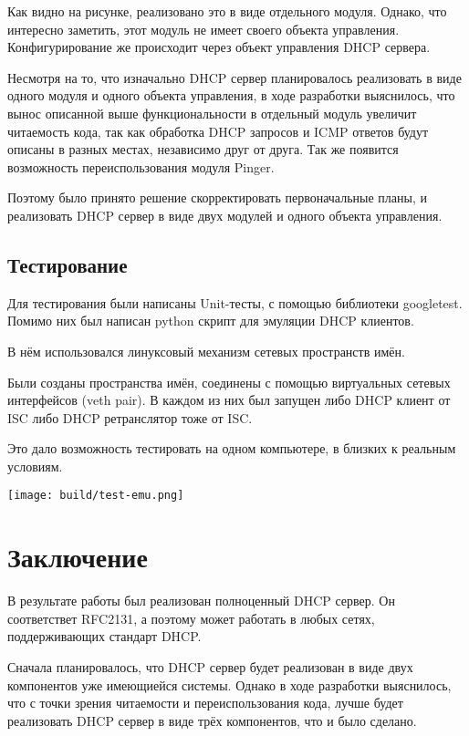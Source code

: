\documentclass[14pt]{extarticle}
\begin{document}
Как видно на рисунке, реализовано это в виде отдельного модуля. Однако, что интересно заметить, этот модуль не имеет своего объекта управления. Конфигурирование же происходит через объект управления DHCP сервера.

Несмотря на то, что изначально DHCP сервер планировалось реализовать в виде одного модуля и одного объекта управления, в ходе разработки выяснилось, что вынос описанной выше функциональности в отдельный модуль увеличит читаемость кода, так как обработка DHCP запросов и ICMP ответов будут описаны в разных местах, независимо друг от друга. Так же появится возможность переиспользования модуля Pinger.

Поэтому было принято решение скорректировать первоначальные планы, и реализовать DHCP сервер в виде двух модулей и одного объекта управления.

\pagebreak
\subsection{Тестирование}

Для тестирования были написаны Unit-тесты, с помощью библиотеки googletest.
Помимо них был написан python скрипт для эмуляции DHCP клиентов.

В нём использовался линуксовый механизм сетевых пространств имён.

Были созданы пространства имён, соединены с помощью виртуальных сетевых интерфейсов (veth pair). В каждом из них был запущен либо DHCP клиент от ISC либо DHCP ретранслятор тоже от ISC.

Это дало возможность тестировать на одном компьютере, в близких к реальным условиям.

\texttt{[image: build/test-emu.png]}

\pagebreak
\section{Заключение}

В результате работы был реализован полноценный DHCP сервер.
Он соответствет RFC2131, а поэтому может работать в любых сетях, поддерживающих стандарт DHCP.

Сначала планировалось, что DHCP сервер будет реализован в виде двух компонентов уже имеющиейся системы. Однако в ходе разработки выяснилось, что с точки зрения читаемости и переиспользования кода, лучше будет реализовать DHCP сервер в виде трёх компонентов, что и было сделано.
\end{document}
